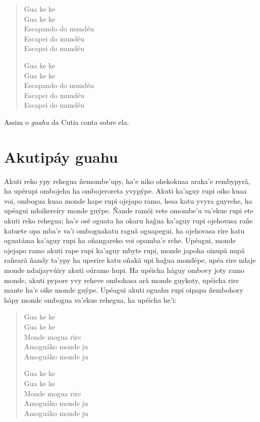 \begin{verse}
Gua ke ke\\
Gua ke ke\\
Escapando do mundéu\\
Escapei do mundéu\\
Escapei do mundéu

Gua ke ke\\
Gua ke ke\\
Escapando do mundéu\\
Escapei do mundéu\\
Escapei do mundéu  
\end{verse}

Assim o \emph{guahu} da Cutia conta sobre ela.

\chapter{Akutipáy guahu}

Akuti reko ypy rehegua ñemombe'upy, ha'e niko ohekokuaa araka'e
rembypyrã, ha upérupi ombojehu ha ombojeroreta yvypýpe. Akuti ka'aguy
rupi oiko kuaa voi, ombogua kuaa monde hape rupi ojejapo ramo, hesa katu
yvyra guyrehe, ha upéagui ndoikereíry monde guýpe. Ñande ramõi vete
omombe'u va'ekue rupi ete akuti reko rehegua; ha'e osẽ oguata ha okaru
hag̃ua ka'aguy rupi ojehovasa rañe katuete opa mba'e va'i omboguakatu
raguã oguapegui, ha ojehovasa rire katu oguatáma ka'aguy rupi ha
oñangareko voi opamba'e rehe. Upéagui, monde ojejapo ramo akuti rape
rupi ka'aguy mbyte rupi, monde japoha oinupã nupã rañearã ñandy ta'ypy
ha uperire katu oñakã upi hag̃ua mondépe, upéa rire ndaje monde
ndaijayvúiry akuti oúramo hupi. Ha upéicha háguy ombovy joty ramo monde,
akuti pypore yvy reheve ombohasa arã monde guykoty, upéicha rire mante
ha'e oike monde guýpe. Upéagui akuti oguahu rupi oipapa ñembohory hápy
monde ombogua va'ekue rehegua, ha upéicha he'i:

\begin{verse}
Gua ke ke\\
Gua ke ke\\
Monde mogua rire\\
Amoguáko monde ju\\
Amoguáko monde ju
       
Gua ke ke\\
Gua ke ke\\
Monde mogua rire\\
Amoguáko monde ju\\
Amoguáko monde ju 
\end{verse}

